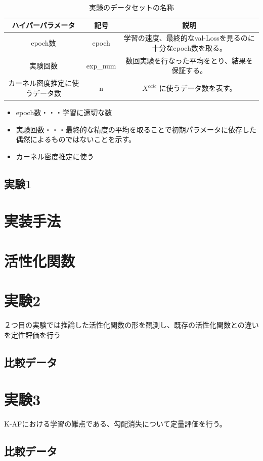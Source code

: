 \begin{table}[htbp]
    \begin{center}
        \caption{実験のデータセットの名称}
        \vspace{5mm} 
        \begin{tabular}{||c c c||}
        ハイパーパラメータ & 記号 & 説明 \\
        \hline
        epoch数                           & epoch       & 学習の速度、最終的なval-Lossを見るのに十分なepoch数を取る。  \\
        実験回数                           & exp\_num     & 数回実験を行なった平均をとり、結果を保証する。 \\
        カーネル密度推定に使うデータ数        & n           & $ X^{calc} $ に使うデータ数を表す。  \\
        \end{tabular}
    \end{center}
\end{table}



\begin{itemize}
    \setlength{\parskip}{0cm} %
    \setlength{\itemsep}{0cm} %
    \item epoch数・・・学習に適切な数
    \item 実験回数・・・最終的な精度の平均を取ることで初期パラメータに依存した偶然によるものではないことを示す。
    \item カーネル密度推定に使う
\end{itemize}



\subsection{実験1}
\section{実装手法}


\section{活性化関数}




\section{実験2}
\label{exp2}
２つ目の実験では推論した活性化関数の形を観測し、既存の活性化関数との違いを定性評価を行う
\subsection{比較データ}


\section{実験3}
\label{exp3}
K-AFにおける学習の難点である、勾配消失について定量評価を行う。
\subsection{比較データ}


